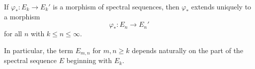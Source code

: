 If $\varphi_* : E_k \to E_k'$ is a morphism of spectral sequences, then $\varphi_*$ extends uniquely to a morphism
$$\varphi_* : E_n \to E_n'$$
for all $n$ with $k \leq n \leq \infty$.

In particular, the term $E_{m,n}$ for $m, n \geq k$ depends naturally on the part of the spectral sequence $E$ beginning with $E_k$.
